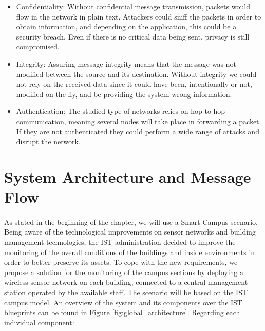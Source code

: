 \begin{itemize}
	\item Confidentiality: Without confidential message transmission, packets would flow in the network in plain text. Attackers could sniff the packets in order to obtain information, and depending on the application, this could be a security breach. Even if there is no critical data being sent, privacy is still compromised.\\
	\item Integrity: Assuring message integrity means that the message was not modified between the source and its destination. Without integrity we could not rely on the received data since it could have been, intentionally or not, modified on the fly, and be providing the system wrong information.\\
	\item Authentication: The studied type of networks relies on hop-to-hop communication, meaning several nodes will take place in forwarding a packet. If they are not authenticated they could perform a wide range of attacks and disrupt the network.
\end{itemize}

\section{System Architecture and Message Flow}
\paragraph{}

As stated in the beginning of the chapter, we will use a Smart Campus scenario. Being aware of the technological improvements on sensor networks and building management technologies, the \gls{IST} administration decided to improve the monitoring of the overall conditions of the buildings and inside environments in order to better preserve its assets. To cope with the new requirements, we propose a solution for the monitoring of the campus sections by deploying a wireless sensor network on each building, connected to a central management station operated by the available staff. The scenario will be based on the \gls{IST} campus model. An overview of the system and its components over the \gls{IST} blueprints can be found in Figure \ref{fig:global_architecture}. Regarding each individual component:

